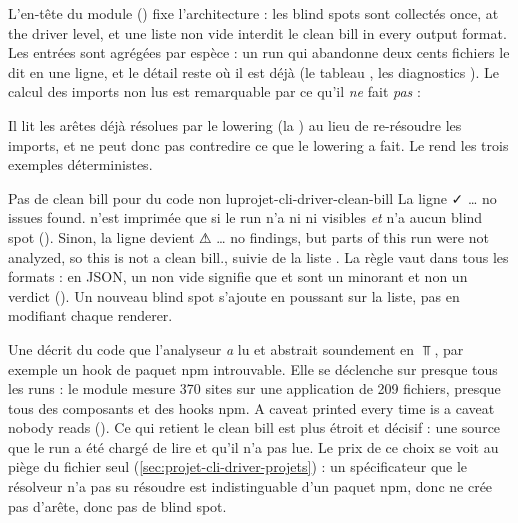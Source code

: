 
L'en-tête du module () fixe l'architecture : les blind spots sont collectés \og once, at the driver level\fg{}, et une liste non vide interdit le clean bill \og in every output format\fg{}. Les entrées sont agrégées par espèce : un run qui abandonne deux cents fichiers le dit en une ligne, et le détail reste où il est déjà (le tableau , les diagnostics ). Le calcul des imports non lus est remarquable par ce qu'il \emph{ne} fait \emph{pas} :


Il lit les arêtes déjà résolues par le lowering (la ) au lieu de re-résoudre les imports, et ne peut donc pas contredire ce que le lowering a fait. Le  rend les trois exemples déterministes.

\begin{invariant}{Pas de clean bill pour du code non lu}{projet-cli-driver-clean-bill}
La ligne \og ✓ … no issues found.\fg{} n'est imprimée que si le run n'a ni \Error{} ni \Warning{} visibles \emph{et} n'a aucun blind spot (). Sinon, la ligne devient \og ⚠ … no findings, but parts of this run were not analyzed, so this is not a clean bill.\fg{}, suivie de la liste . La règle vaut dans tous les formats : en JSON, un  non vide signifie que  et  sont un minorant et non un verdict (). Un nouveau blind spot s'ajoute en poussant sur la liste, pas en modifiant chaque renderer.
\end{invariant}

\begin{decision}
Une \Info{}  décrit du code que l'analyseur \emph{a} lu et abstrait soundement en $\Top$, par exemple un hook de paquet npm introuvable. Elle se déclenche sur presque tous les runs : le module mesure 370 sites sur une application de 209 fichiers, presque tous des composants et des hooks npm. \og A caveat printed every time is a caveat nobody reads\fg{} (). Ce qui retient le clean bill est plus étroit et décisif : une source que le run a été chargé de lire et qu'il n'a pas lue. Le prix de ce choix se voit au piège du fichier seul (\cref{sec:projet-cli-driver-projets}) : un spécificateur que le résolveur n'a pas su résoudre est indistinguable d'un paquet npm, donc ne crée pas d'arête, donc pas de blind spot.
\end{decision}

